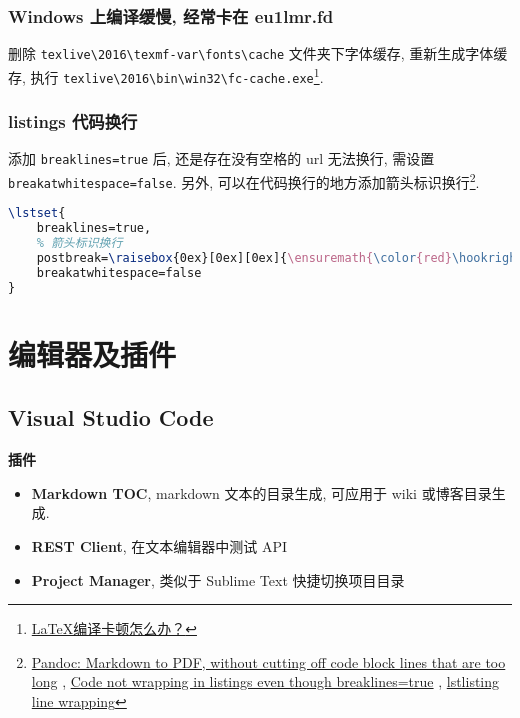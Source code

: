 \subsubsection{Windows 上编译缓慢, 经常卡在
eu1lmr.fd}\label{windows-ux4e0aux7f16ux8bd1ux7f13ux6162-ux7ecfux5e38ux5361ux5728-eu1lmr.fd}

删除 \lstinline!texlive\2016\texmf-var\fonts\cache! 文件夹下字体缓存,
重新生成字体缓存, 执行
\lstinline!texlive\2016\bin\win32\fc-cache.exe!\footnote{\href{https://www.zhihu.com/question/51999238/answer/135852542}{LaTeX编译卡顿怎么办？}}.

\subsubsection{listings
代码换行}\label{listings-ux4ee3ux7801ux6362ux884c}

添加 \lstinline!breaklines=true! 后, 还是存在没有空格的 url 无法换行,
需设置 \lstinline!breakatwhitespace=false!. 另外,
可以在代码换行的地方添加箭头标识换行\footnote{\href{http://tex.stackexchange.com/questions/179926/pandoc-markdown-to-pdf-without-cutting-off-code-block-lines-that-are-too-long}{Pandoc:
  Markdown to PDF, without cutting off code block lines that are too
  long} ,
  \href{http://tex.stackexchange.com/questions/174569/code-not-wrapping-in-listings-even-though-breaklines-true}{Code
  not wrapping in listings even though breaklines=true} ,
  \href{http://tex.stackexchange.com/questions/116534/lstlisting-line-wrapping}{lstlisting
  line wrapping}}.

\begin{lstlisting}[language=TeX]
\lstset{
    breaklines=true,
    % 箭头标识换行
    postbreak=\raisebox{0ex}[0ex][0ex]{\ensuremath{\color{red}\hookrightarrow\space}},
    breakatwhitespace=false
}
\end{lstlisting}

\section{编辑器及插件}\label{ux7f16ux8f91ux5668ux53caux63d2ux4ef6}

\subsection{Visual Studio Code}\label{visual-studio-code}

\textbf{插件}

\begin{itemize}
\tightlist
\item
  \textbf{Markdown TOC}, markdown 文本的目录生成, 可应用于 wiki
  或博客目录生成.
\item
  \textbf{REST Client}, 在文本编辑器中测试 API
\item
  \textbf{Project Manager}, 类似于 Sublime Text 快捷切换项目目录
\end{itemize}


